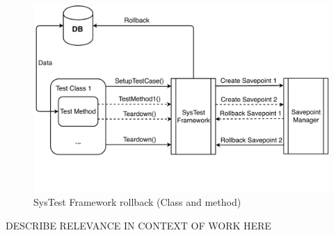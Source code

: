 \begin{figure}[ht]
	\centering
	\includegraphics[scale=0.6]{Images/SysTestRollback.pdf}
	\caption{SysTest Framework rollback (Class and method)}
	\label{fig:SysTestRollback}
\end{figure}

DESCRIBE RELEVANCE IN CONTEXT OF WORK HERE
